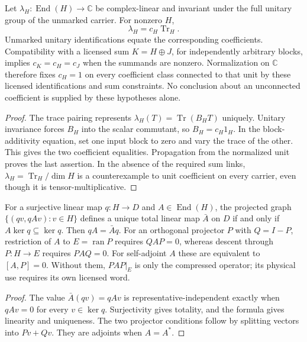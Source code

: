 \documentclass[11pt,a4paper]{article}
\begin{document}
\begin{lemma}
\label{p2a:lem:repair-natural-functional-coefficients}
Let $\lambda_H:\operatorname{End}(H)\to\mathbb C$ be complex-linear and
invariant under the full unitary group of the unmarked carrier. For nonzero $H$,
\[
 \lambda_H=c_H\operatorname{Tr}_H.
\]
Unmarked unitary identifications equate the corresponding coefficients.
Compatibility with a licensed sum $K=H\oplus J$, for independently arbitrary
blocks, implies $c_K=c_H=c_J$ when the summands are nonzero. Normalization on
$\mathbb C$ therefore fixes $c_H=1$ on every coefficient class connected to
that unit by these licensed identifications and sum constraints. No conclusion
about an unconnected coefficient is supplied by these hypotheses alone.
\end{lemma}
\begin{proof}
The trace pairing represents $\lambda_H(T)=\operatorname{Tr}(B_HT)$ uniquely.
Unitary invariance forces $B_H$ into the scalar commutant, so $B_H=c_H1_H$.
In the block-additivity equation, set one input block to zero and vary the
trace of the other. This gives the two coefficient equalities. Propagation
from the normalized unit proves the last assertion. In the absence of the
required sum links, $\lambda_H=\operatorname{Tr}_H/\dim H$ is a counterexample
to unit coefficient on every carrier, even though it is tensor-multiplicative.
\end{proof}

\begin{lemma}
\label{p2a:lem:repair-operator-graph-descent}
For a surjective linear map $q:H\to D$ and $A\in\operatorname{End}(H)$,
the projected graph $\{(qv,qAv):v\in H\}$ defines a unique total linear map
$\bar A$ on $D$ if and only if $A\ker q\subseteq\ker q$. Then
$qA=\bar A q$.
For an orthogonal projector $P$ with $Q=I-P$, restriction of $A$ to
$E=\operatorname{ran}P$ requires $QAP=0$, whereas descent through
$P:H\to E$ requires $PAQ=0$. For self-adjoint $A$ these are equivalent to
$[A,P]=0$. Without them, $PAP|_E$ is only the compressed operator; its
physical use requires its own licensed word.
\end{lemma}
\begin{proof}
The value $\bar A(qv)=qAv$ is representative-independent exactly when
$qAv=0$ for every $v\in\ker q$. Surjectivity gives totality, and the
formula gives linearity and uniqueness. The two projector conditions follow
by splitting vectors into $Pv+Qv$. They are adjoints when $A=A^*$.
\end{proof}
\end{document}
